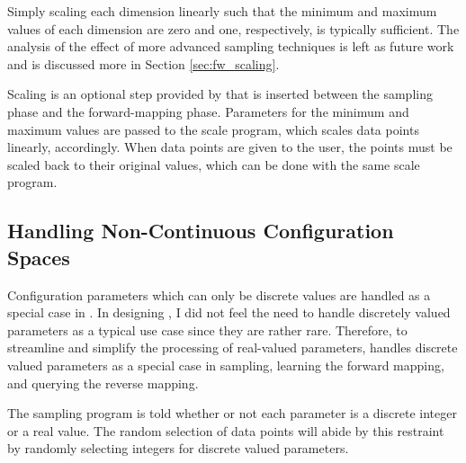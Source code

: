 Simply scaling each dimension linearly such that the minimum and maximum values of each dimension are zero and one, respectively, is typically sufficient.
The analysis of the effect of more advanced sampling techniques is left as future work and is discussed more in Section \ref{sec:fw_scaling}.


Scaling is an optional step provided by \fw that is inserted between the sampling phase and the forward-mapping phase.
Parameters for the minimum and maximum values are passed to the scale program, which  scales data points linearly, accordingly.
When data points are given to the user, the points must be scaled back to their original values, which can be done with the same scale program.



\subsection{Handling Non-Continuous Configuration Spaces}

Configuration parameters which can only be discrete values are handled as a special case in \fw.
In designing \fw, I did not feel the need to handle discretely valued parameters as a typical use case since they are rather rare.
Therefore, to streamline and simplify the processing of real-valued parameters, \fw handles discrete valued parameters as a special case in sampling, learning the forward mapping, and querying the reverse mapping.

The sampling program is told whether or not each parameter is a discrete integer or a real value.
The random selection of data points will abide by this restraint by randomly selecting integers for discrete valued parameters.

